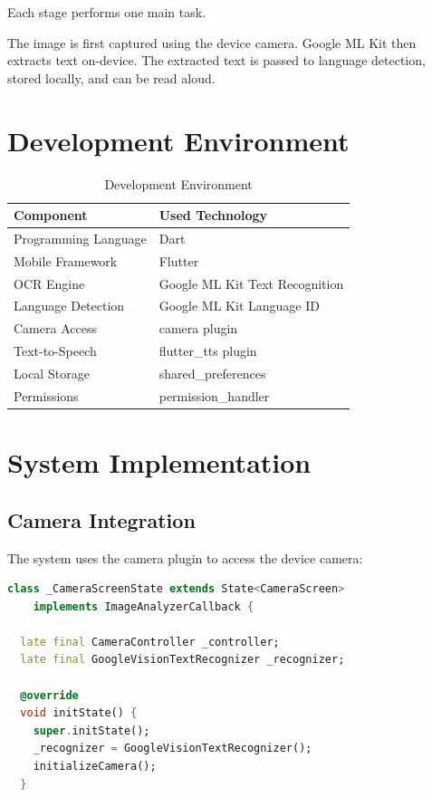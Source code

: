 \documentclass[12pt,a4paper]{report}
\begin{document}
Each stage performs one main task.

The image is first captured using the device camera. Google ML Kit then extracts text on-device. The extracted text is passed to language detection, stored locally, and can be read aloud.

\section{Development Environment}

\begin{table}[H]
\centering
\caption{Development Environment}
\begin{tabular}{|p{4cm}|p{7cm}|}
\hline
\textbf{Component} & \textbf{Used Technology} \\ \hline
Programming Language & Dart \\ \hline
Mobile Framework & Flutter \\ \hline
OCR Engine & Google ML Kit Text Recognition \\ \hline
Language Detection & Google ML Kit Language ID \\ \hline
Camera Access & camera plugin \\ \hline
Text-to-Speech & flutter\_tts plugin \\ \hline
Local Storage & shared\_preferences \\ \hline
Permissions & permission\_handler \\ \hline
\end{tabular}
\end{table}

\section{System Implementation}

\subsection{Camera Integration}

The system uses the camera plugin to access the device camera:

\begin{lstlisting}[language=Dart]
class _CameraScreenState extends State<CameraScreen> 
    implements ImageAnalyzerCallback {
  
  late final CameraController _controller;
  late final GoogleVisionTextRecognizer _recognizer;
  
  @override
  void initState() {
    super.initState();
    _recognizer = GoogleVisionTextRecognizer();
    initializeCamera();
  }
\end{lstlisting}
\end{document}
